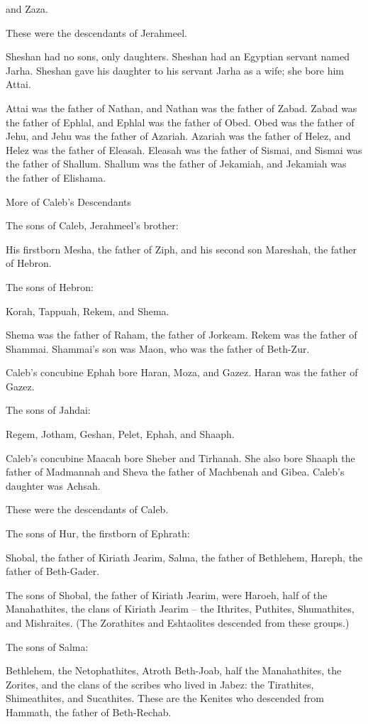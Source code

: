 {and Zaza.
\par }{\PP These
were the descendants
of Jerahmeel.
\par }{\PP {}Sheshan
had no
sons,
only
daughters.
Sheshan
had an Egyptian
servant
named
Jarha.
Sheshan
gave
his daughter
to his servant
Jarha
as a wife;
she bore
him Attai.
\par }{\PP {}Attai
was the father
of Nathan,
and Nathan
was the father
of Zabad.
Zabad
was the father
of Ephlal,
and Ephlal
was the father
of Obed.
Obed
was the father
of Jehu,
and Jehu
was the father
of Azariah.
Azariah
was the father
of Helez,
and Helez
was the father
of Eleasah.
Eleasah
was the father
of Sismai,
and Sismai
was the father
of Shallum.
Shallum
was the father
of Jekamiah,
and Jekamiah
was the father
of Elishama.
\par }{\SH More of Caleb’s Descendants
\par }{\PP {}The sons
of Caleb,
Jerahmeel’s
brother:
\par }{\PP His firstborn
Mesha,
the father
of Ziph,
and his second son
Mareshah,
the father
of Hebron.
\par }{\PP {}The sons
of Hebron:
\par }{\PP Korah,
Tappuah,
Rekem,
and Shema.
\par }{\PP {}Shema
was
the father
of Raham,
the father
of Jorkeam.
Rekem
was the father
of Shammai.
Shammai’s
son
was Maon,
who was the father
of Beth-Zur.
\par }{\PP {}Caleb’s
concubine
Ephah
bore
Haran,
Moza,
and Gazez.
Haran
was the father
of Gazez.
\par }{\PP {}The sons
of Jahdai:
\par }{\PP Regem,
Jotham,
Geshan,
Pelet,
Ephah,
and Shaaph.
\par }{\PP {}Caleb’s
concubine
Maacah
bore
Sheber
and Tirhanah.
She also bore
Shaaph
the father
of Madmannah
and Sheva
the father
of Machbenah
and Gibea.
Caleb’s
daughter
was Achsah.
\par }{\PP {}These
were the descendants
of Caleb.
\par }{\PP The sons
of Hur,
the firstborn
of Ephrath:
\par }{\PP Shobal,
the father
of Kiriath Jearim,
Salma,
the father
of Bethlehem,
Hareph,
the father
of Beth-Gader.
\par }{\PP {}The sons
of Shobal,
the father
of Kiriath Jearim,
were Haroeh,
half
of the Manahathites,
the clans
of Kiriath Jearim
– the Ithrites,
Puthites,
Shumathites,
and Mishraites.
(The Zorathites
and Eshtaolites
descended from
these groups.)
\par }{\PP {}The sons
of Salma:
\par }{\PP Bethlehem,
the Netophathites,
Atroth Beth-Joab,
half
the Manahathites,
the Zorites,
and the clans
of the scribes
who lived
in Jabez: the Tirathites,
Shimeathites,
and Sucathites.
These are the Kenites
who descended
from Hammath,
the father
of Beth-Rechab.

}
